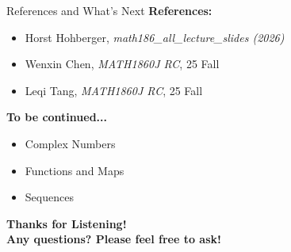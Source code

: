 \documentclass[dvipsnames]{beamer}
\theoremstyle{plain}
\theoremstyle{definition}
\begin{document}
\begin{frame}{References and What's Next}
\large \textbf{References:}
\vspace{0.5em}
\begin{itemize}
  \item Horst Hohberger, \textit{math186\_all\_lecture\_slides (2026)}
  \item Wenxin Chen, \textit{MATH1860J RC}, 25 Fall
  \item Leqi Tang, \textit{MATH1860J RC}, 25 Fall
\end{itemize}
\vspace{1cm}
\large \textbf{To be continued...} \\
\vspace{0.5em}
\begin{itemize}
    \item Complex Numbers
    \item Functions and Maps
    \item Sequences
\end{itemize}
\end{frame}

\begin{frame}
    \begin{center}
    \huge \textbf{Thanks for Listening!} \\
    \vspace{0.5cm}
    \large \textbf{Any questions? Please feel free to ask!} \\
    \end{center}
\end{frame}
\end{document}
